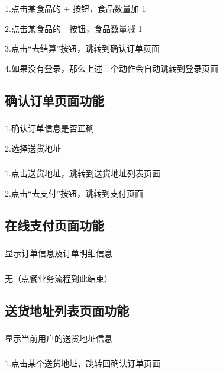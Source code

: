 \subsubsection*{}
1.点击某食品的 + 按钮，食品数量加 1

2.点击某食品的 - 按钮，食品数量减 1

3.点击“去结算”按钮，跳转到确认订单页面

4.如果没有登录，那么上述三个动作会自动跳转到登录页面

\subsection{确认订单页面功能}
\subsubsection*{}
1.确认订单信息是否正确

2.选择送货地址
\subsubsection*{}
1.点击送货地址，跳转到送货地址列表页面

2.点击“去支付”按钮，跳转到支付页面

\subsection{在线支付页面功能}
\subsubsection*{}
显示订单信息及订单明细信息
\subsubsection*{}
无（点餐业务流程到此结束）

\subsection{送货地址列表页面功能}
\subsubsection*{}
显示当前用户的送货地址信息
\subsubsection*{}
1.点击某个送货地址，跳转回确认订单页面

